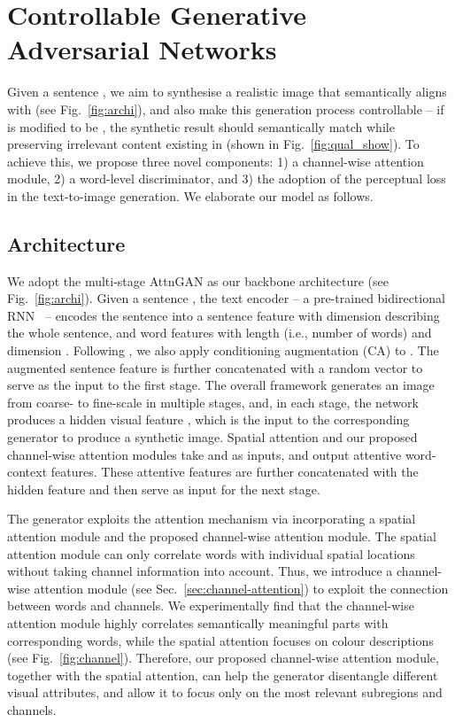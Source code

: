 \documentclass{article}
\begin{document}
\section{Controllable Generative Adversarial Networks}
\label{controlGAN}

Given a sentence , we aim to synthesise a realistic image  that semantically aligns with  (see Fig.~\ref{fig:archi}), and also make this generation process controllable -- if  is modified to be , the synthetic result  should semantically match  while preserving irrelevant content existing in  (shown in Fig.~\ref{fig:qual_show}). To achieve this, we propose three novel components: 1) a channel-wise attention module, 2) a word-level discriminator, and 3) the adoption of the perceptual loss in the text-to-image generation. We elaborate our model as follows.  

\subsection{Architecture}

We adopt the multi-stage AttnGAN \cite{xu2018attngan} as our backbone architecture (see Fig.~\ref{fig:archi}).
Given a sentence , the text encoder -- a pre-trained bidirectional RNN~\cite{xu2018attngan} --
encodes the sentence  into a sentence feature  with dimension  describing the whole sentence, and word features  with length  (i.e., number of words) and dimension .  
Following \cite{zhang2017stackgan}, we also apply conditioning augmentation (CA) to .
The augmented sentence feature  is further concatenated with a random vector  to serve as the input to the first stage. 
The overall framework generates an image from coarse- to fine-scale in multiple stages, and, in each stage, the network produces a hidden visual feature , which is the input to the corresponding generator  to produce a synthetic image.
Spatial attention \cite{xu2018attngan} and our proposed channel-wise attention modules {take  and  as inputs}, and output attentive word-context features.
These attentive features are further concatenated with the hidden feature  and then serve as input for the next stage.

The generator exploits the attention mechanism via incorporating a spatial attention module \cite{xu2018attngan} and the proposed channel-wise attention module. The spatial attention module \cite{xu2018attngan} can only correlate words with individual spatial locations without taking channel information into account.
Thus, we introduce a channel-wise attention module (see Sec.~\ref{sec:channel-attention}) {to exploit the connection between words and channels}.
We experimentally find that the channel-wise attention module highly correlates semantically meaningful parts with corresponding words, while the spatial attention focuses on colour descriptions (see Fig.~\ref{fig:channel}).
{Therefore,} {our proposed channel-wise attention module, together with the spatial attention}, can help the generator disentangle different visual attributes, and allow it to focus {only} on the most relevant subregions and channels.
\end{document}
